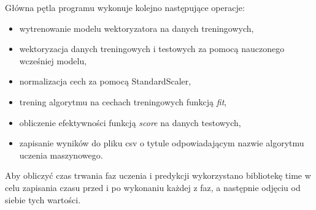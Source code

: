 Główna pętla programu wykonuje kolejno następujące operacje:
\begin{itemize}
    \item wytrenowanie modelu wektoryzatora na danych treningowych,
    \item wektoryzacja danych treningowych i testowych za pomocą 
    nauczonego wcześniej modelu,
    \item normalizacja cech za pomocą StandardScaler,
    \item trening algorytmu na cechach treningowych funkcją \textit{fit},
    \item obliczenie efektywności funkcją \textit{score} na danych testowych,
    \item zapisanie wyników do pliku csv o tytule odpowiadającym nazwie algorytmu 
    uczenia maszynowego.
\end{itemize}
Aby obliczyć czas trwania faz uczenia i predykcji wykorzystano bibliotekę time w celu
zapisania czasu przed i po wykonaniu każdej z faz, a następnie odjęciu od siebie tych wartości.
